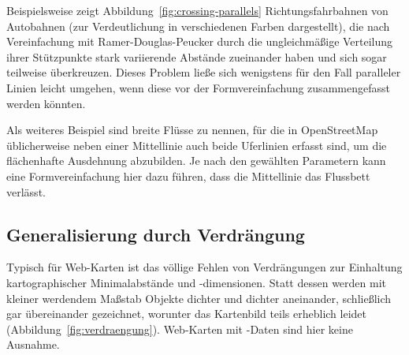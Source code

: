 \documentclass[../main/thesis.tex]{subfiles}
\begin{document}
Beispielsweise zeigt Abbildung~\ref{fig:crossing-parallels} Richtungsfahrbahnen von Autobahnen (zur Verdeutlichung in verschiedenen Farben dargestellt), die nach Vereinfachung mit Ramer-Douglas-Peucker durch die ungleichmäßige Verteilung ihrer Stützpunkte stark variierende Abstände zueinander haben und sich sogar teilweise überkreuzen.
Dieses Problem ließe sich wenigstens für den Fall paralleler Linien leicht umgehen, wenn diese vor der Formvereinfachung zusammengefasst werden könnten.

Als weiteres Beispiel sind breite Flüsse zu nennen, für die in OpenStreetMap üblicherweise neben einer Mittellinie auch beide Uferlinien erfasst sind, um die flächenhafte Ausdehnung abzubilden.
Je nach den gewählten Parametern kann eine Formvereinfachung hier dazu führen, dass die Mittellinie das Flussbett verlässt. 



\subsection{Generalisierung durch Verdrängung}

Typisch für Web-Karten ist das völlige Fehlen von Verdrängungen zur Einhaltung kartographischer Minimalabstände und -dimensionen.
Statt dessen werden mit kleiner werdendem Maßstab Objekte dichter und dichter aneinander, schließlich gar übereinander gezeichnet, worunter das Kartenbild teils erheblich leidet (Abbildung~\ref{fig:verdraengung}).
Web-Karten mit \osm-Daten sind hier keine Ausnahme.

\end{document}
